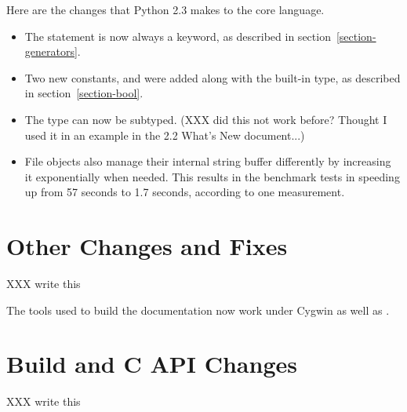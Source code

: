 \documentclass{howto}
\begin{document}
Here are the changes that Python 2.3 makes to the core language.

\begin{itemize}
\item The  statement is now always a keyword, as
described in section~\ref{section-generators}.

\item Two new constants,  and  were
added along with the built-in  type, as described in
section~\ref{section-bool}.

\item The  type can now be subtyped.  (XXX did this not work
before?  Thought I used it in an example in the 2.2 What's New document...)

\item File objects also manage their internal string buffer
differently by increasing it exponentially when needed.  
This results in the benchmark tests in  
speeding up from 57 seconds to 1.7 seconds, according to one
measurement.

\end{itemize}


\section{Other Changes and Fixes}

XXX write this

The tools used to build the documentation now work under Cygwin as
well as \UNIX.


\section{Build and C API Changes}

XXX write this
\end{document}

